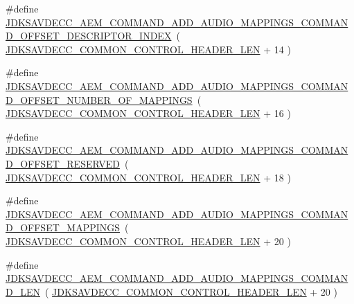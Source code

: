 \begin{DoxyCompactItemize}
\item 
\#define \hyperlink{group__command__add__audio__mappings_ga3955b8927b9132617a2224610b232a67}{J\+D\+K\+S\+A\+V\+D\+E\+C\+C\+\_\+\+A\+E\+M\+\_\+\+C\+O\+M\+M\+A\+N\+D\+\_\+\+A\+D\+D\+\_\+\+A\+U\+D\+I\+O\+\_\+\+M\+A\+P\+P\+I\+N\+G\+S\+\_\+\+C\+O\+M\+M\+A\+N\+D\+\_\+\+O\+F\+F\+S\+E\+T\+\_\+\+D\+E\+S\+C\+R\+I\+P\+T\+O\+R\+\_\+\+I\+N\+D\+EX}~( \hyperlink{group__jdksavdecc__avtp__common__control__header_gaae84052886fb1bb42f3bc5f85b741dff}{J\+D\+K\+S\+A\+V\+D\+E\+C\+C\+\_\+\+C\+O\+M\+M\+O\+N\+\_\+\+C\+O\+N\+T\+R\+O\+L\+\_\+\+H\+E\+A\+D\+E\+R\+\_\+\+L\+EN} + 14 )
\item 
\#define \hyperlink{group__command__add__audio__mappings_ga266d1d805e3c972db7e42f1e251f814a}{J\+D\+K\+S\+A\+V\+D\+E\+C\+C\+\_\+\+A\+E\+M\+\_\+\+C\+O\+M\+M\+A\+N\+D\+\_\+\+A\+D\+D\+\_\+\+A\+U\+D\+I\+O\+\_\+\+M\+A\+P\+P\+I\+N\+G\+S\+\_\+\+C\+O\+M\+M\+A\+N\+D\+\_\+\+O\+F\+F\+S\+E\+T\+\_\+\+N\+U\+M\+B\+E\+R\+\_\+\+O\+F\+\_\+\+M\+A\+P\+P\+I\+N\+GS}~( \hyperlink{group__jdksavdecc__avtp__common__control__header_gaae84052886fb1bb42f3bc5f85b741dff}{J\+D\+K\+S\+A\+V\+D\+E\+C\+C\+\_\+\+C\+O\+M\+M\+O\+N\+\_\+\+C\+O\+N\+T\+R\+O\+L\+\_\+\+H\+E\+A\+D\+E\+R\+\_\+\+L\+EN} + 16 )
\item 
\#define \hyperlink{group__command__add__audio__mappings_gacfab9fb4e32637c83f1416cf4c8e55b3}{J\+D\+K\+S\+A\+V\+D\+E\+C\+C\+\_\+\+A\+E\+M\+\_\+\+C\+O\+M\+M\+A\+N\+D\+\_\+\+A\+D\+D\+\_\+\+A\+U\+D\+I\+O\+\_\+\+M\+A\+P\+P\+I\+N\+G\+S\+\_\+\+C\+O\+M\+M\+A\+N\+D\+\_\+\+O\+F\+F\+S\+E\+T\+\_\+\+R\+E\+S\+E\+R\+V\+ED}~( \hyperlink{group__jdksavdecc__avtp__common__control__header_gaae84052886fb1bb42f3bc5f85b741dff}{J\+D\+K\+S\+A\+V\+D\+E\+C\+C\+\_\+\+C\+O\+M\+M\+O\+N\+\_\+\+C\+O\+N\+T\+R\+O\+L\+\_\+\+H\+E\+A\+D\+E\+R\+\_\+\+L\+EN} + 18 )
\item 
\#define \hyperlink{group__command__add__audio__mappings_gae6e0d2f9951c1e0f947cde329e626569}{J\+D\+K\+S\+A\+V\+D\+E\+C\+C\+\_\+\+A\+E\+M\+\_\+\+C\+O\+M\+M\+A\+N\+D\+\_\+\+A\+D\+D\+\_\+\+A\+U\+D\+I\+O\+\_\+\+M\+A\+P\+P\+I\+N\+G\+S\+\_\+\+C\+O\+M\+M\+A\+N\+D\+\_\+\+O\+F\+F\+S\+E\+T\+\_\+\+M\+A\+P\+P\+I\+N\+GS}~( \hyperlink{group__jdksavdecc__avtp__common__control__header_gaae84052886fb1bb42f3bc5f85b741dff}{J\+D\+K\+S\+A\+V\+D\+E\+C\+C\+\_\+\+C\+O\+M\+M\+O\+N\+\_\+\+C\+O\+N\+T\+R\+O\+L\+\_\+\+H\+E\+A\+D\+E\+R\+\_\+\+L\+EN} + 20 )
\item 
\#define \hyperlink{group__command__add__audio__mappings_ga861cb37521da0ee33e15de79c08c65e8}{J\+D\+K\+S\+A\+V\+D\+E\+C\+C\+\_\+\+A\+E\+M\+\_\+\+C\+O\+M\+M\+A\+N\+D\+\_\+\+A\+D\+D\+\_\+\+A\+U\+D\+I\+O\+\_\+\+M\+A\+P\+P\+I\+N\+G\+S\+\_\+\+C\+O\+M\+M\+A\+N\+D\+\_\+\+L\+EN}~( \hyperlink{group__jdksavdecc__avtp__common__control__header_gaae84052886fb1bb42f3bc5f85b741dff}{J\+D\+K\+S\+A\+V\+D\+E\+C\+C\+\_\+\+C\+O\+M\+M\+O\+N\+\_\+\+C\+O\+N\+T\+R\+O\+L\+\_\+\+H\+E\+A\+D\+E\+R\+\_\+\+L\+EN} + 20 )
\end{DoxyCompactItemize}
